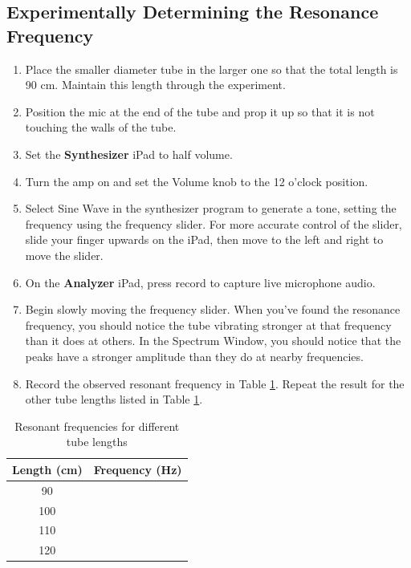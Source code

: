 \documentclass[12pt]{article}
\begin{document}
\subsection{Experimentally Determining the Resonance Frequency}
\begin{enumerate} 
\item Place the smaller diameter tube in the larger one so that the total length is 90 cm. Maintain this length through the experiment. 
\item Position the mic at the end of the tube and prop it  up so that it is not touching the walls of the tube.
\item Set the \textbf{Synthesizer} iPad to half volume.
\item Turn the amp on and set the Volume knob to the 12 o'clock position.
\item Select Sine Wave in the synthesizer program to generate a tone, setting the frequency using the frequency slider. For more accurate control of the slider, slide your finger upwards on the iPad, then move to the left and right to move the slider.
\item On the \textbf{Analyzer} iPad, press record to capture live microphone audio. 
\item Begin slowly moving the frequency slider. When you've found the resonance frequency, you should notice the tube vibrating stronger at that frequency than it does at others. In the Spectrum Window, you should notice that the peaks have a stronger amplitude than they do at nearby frequencies.
\item Record the observed resonant frequency in Table \ref{ResFreqTable}. Repeat the result for the other tube lengths listed in Table \ref{ResFreqTable}.
\end {enumerate}

\begin{table}[!h]
	\begin{center}
    		\begin{tabular}{| c | c |}
		    \hline
	    Length (cm) & Frequency (Hz) \\ \hline
	    90 & \\ \hline
	    100 & \\ \hline
	    110 & \\ \hline
	    120 & \\ \hline
	    \end{tabular}
	\caption{\label{ResFreqTable}Resonant frequencies for different tube lengths}
	\end{center}
\end{table}
\end{document}
